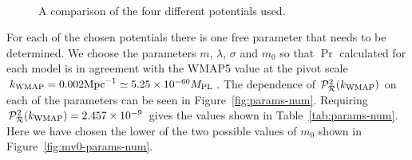 \begin{figure}[htbp]
\centering%
\\%
\caption[Comparison of potentials]{A comparison of the four different potentials
used.}
\label{fig:cmp-pot-num}
\end{figure}


For each of the chosen potentials there is one free parameter that needs to be
determined.
We choose the parameters $m$, $\lambda$, $\sigma$ and $m_0$ so that $\Pr$ calculated
for each model is in agreement with the
WMAP5 value at the pivot scale
$k_\mathrm{WMAP}=0.002\mathrm{Mpc}^{-1} \simeq5.25\times10^{- 60} M_{\mathrm{PL}}$. 
The dependence of $\mathcal{P}_{\mathcal{R}}^2 (k_\mathrm{WMAP})$ on each of the parameters can be seen in
Figure~\ref{fig:params-num}.
Requiring $\mathcal{P}_{\mathcal{R}}^2 (k_\mathrm{WMAP})=2.457\times 10^{-9}$
gives the values shown in Table~\ref{tab:params-num}. Here we have chosen the lower
of the two possible values of $m_0$ shown in Figure~\ref{fig:mv0-params-num}.



